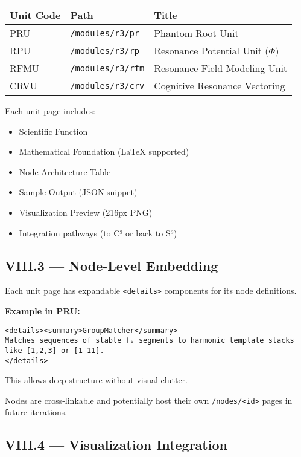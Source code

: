 \begin{center}
\begin{tabular}{|l|l|l|}
\hline
\textbf{Unit Code} & \textbf{Path} & \textbf{Title} \\
\hline
PRU & \texttt{/modules/r3/pr} & Phantom Root Unit \\
RPU & \texttt{/modules/r3/rp} & Resonance Potential Unit ($\Phi$) \\
RFMU & \texttt{/modules/r3/rfm} & Resonance Field Modeling Unit \\
CRVU & \texttt{/modules/r3/crv} & Cognitive Resonance Vectoring \\
\hline
\end{tabular}
\end{center}

Each unit page includes:

\begin{itemize}
    \item Scientific Function
    \item Mathematical Foundation (LaTeX supported)
    \item Node Architecture Table
    \item Sample Output (JSON snippet)
    \item Visualization Preview (216px PNG)
    \item Integration pathways (to C³ or back to S³)
\end{itemize}

\subsection*{VIII.3 — Node-Level Embedding}

Each unit page has expandable \texttt{<details>} components for its node definitions.

\textbf{Example in PRU:}

\begin{verbatim}
<details><summary>GroupMatcher</summary>
Matches sequences of stable f₀ segments to harmonic template stacks like [1,2,3] or [1–11].
</details>
\end{verbatim}

This allows deep structure without visual clutter.

Nodes are cross-linkable and potentially host their own \texttt{/nodes/<id>} pages in future iterations.

\subsection*{VIII.4 — Visualization Integration}

